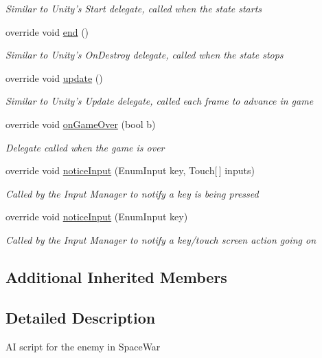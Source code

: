\begin{DoxyCompactItemize}
\begin{DoxyCompactList}\small\item\em Similar to Unity's Start delegate, called when the state starts \end{DoxyCompactList}\item 
override void \hyperlink{class_space_war_state_ae411bb8b76dc8e3eb4f41e60b68306c8}{end} ()
\begin{DoxyCompactList}\small\item\em Similar to Unity's On\-Destroy delegate, called when the state stops \end{DoxyCompactList}\item 
override void \hyperlink{class_space_war_state_a1359aae13f67fb97de75307349b8ee81}{update} ()
\begin{DoxyCompactList}\small\item\em Similar to Unity's Update delegate, called each frame to advance in game \end{DoxyCompactList}\item 
override void \hyperlink{class_space_war_state_a9297a9e552fd452d35af06e1e57749dc}{on\-Game\-Over} (bool b)
\begin{DoxyCompactList}\small\item\em Delegate called when the game is over \end{DoxyCompactList}\item 
override void \hyperlink{class_space_war_state_a3eabccff86c38c3a66fbd94ed1080ac4}{notice\-Input} (Enum\-Input key, Touch\mbox{[}$\,$\mbox{]} inputs)
\begin{DoxyCompactList}\small\item\em Called by the Input Manager to notify a key is being pressed \end{DoxyCompactList}\item 
override void \hyperlink{class_space_war_state_ad7a98786e6a5e801bc8342b0c8c5da94}{notice\-Input} (Enum\-Input key)
\begin{DoxyCompactList}\small\item\em Called by the Input Manager to notify a key/touch screen action going on \end{DoxyCompactList}\end{DoxyCompactItemize}
\subsection*{Additional Inherited Members}


\subsection{Detailed Description}
A\-I script for the enemy in Space\-War 



